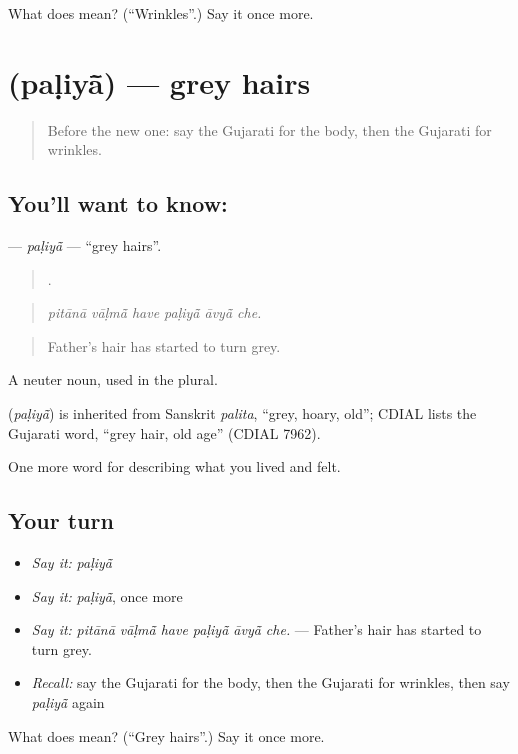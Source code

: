 \begin{tcolorbox}[breakable,colback=teal!4,colframe=teal!35!black,title={Before you move on}]
What does  mean? (\textquotedblleft{}Wrinkles\textquotedblright{}.) Say it once more.
\end{tcolorbox}
\section[\texorpdfstring{\gu{પળિયાં} (paḷiyā̃)}{પળિયાં (paḷiyā̃)}]{ (paḷiyā̃) — grey hairs}

\label{lesson:GU-C471-paliya}



\begin{quote}
Before the new one: say the Gujarati for the body, then the Gujarati for wrinkles.
\end{quote}

\subsection*{You'll want to know: }
\textbf{} — \emph{paḷiyā̃} — \textquotedblleft{}grey hairs\textquotedblright{}.

\begin{quote}
     .
\end{quote}

\begin{quote}
\emph{pitānā vāḷmā̃ have paḷiyā̃ āvyā̃ che.}
\end{quote}

\begin{quote}
Father's hair has started to turn grey.
\end{quote}

A neuter noun, used in the plural.

\begin{cousinweb}
\textbf{} (\emph{paḷiyā̃}) is inherited from Sanskrit \emph{palita}, \textquotedblleft{}grey, hoary, old\textquotedblright{}; CDIAL lists the Gujarati word, \textquotedblleft{}grey hair, old age\textquotedblright{} (CDIAL 7962).
\end{cousinweb}

\begin{grammarlens}[title={What you've built}]
One more word for describing what you lived and felt.
\end{grammarlens}

\subsection*{Your turn}
\begin{itemize}
\raggedright
  \item \emph{Say it:} \emph{paḷiyā̃}
  \item \emph{Say it:} \emph{paḷiyā̃}, once more
  \item \emph{Say it:} \emph{pitānā vāḷmā̃ have paḷiyā̃ āvyā̃ che.} — Father's hair has started to turn grey.
  \item \emph{Recall:} say the Gujarati for the body, then the Gujarati for wrinkles, then say \emph{paḷiyā̃} again
\end{itemize}

\begin{tcolorbox}[breakable,colback=teal!4,colframe=teal!35!black,title={Before you move on}]
What does  mean? (\textquotedblleft{}Grey hairs\textquotedblright{}.) Say it once more.
\end{tcolorbox}
